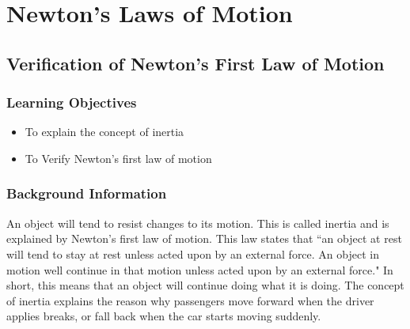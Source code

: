 \section{Newton's Laws of Motion}




\subsection{Verification of Newton's First Law of Motion}

\subsubsection*{Learning Objectives}
\begin{itemize}
\item{To explain the concept of inertia} 
\item{To Verify Newton's first law of motion} 
\end{itemize}

\subsubsection*{Background Information}
An object will tend to resist changes to its motion. This is called inertia and is explained by Newton's first law of motion. This law states that ``an object at rest will tend to stay at rest unless acted upon by an external force. An object in motion well continue in that motion unless acted upon by an external force."  In short, this means that an object will continue doing what it is doing. The concept of inertia explains the reason why passengers move forward when the driver applies breaks, or fall back when the car starts moving suddenly.

